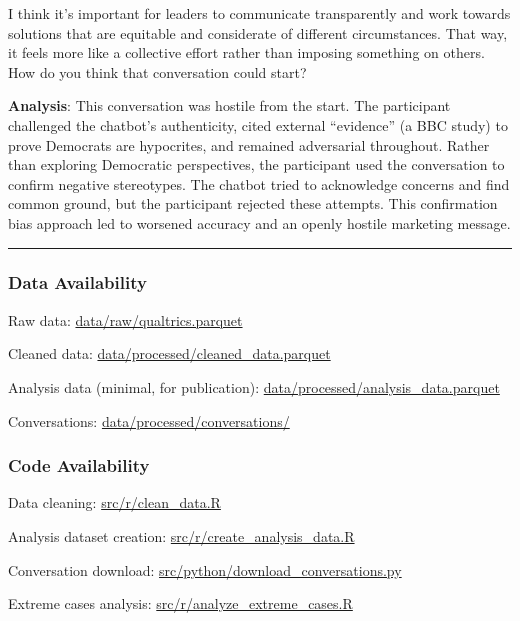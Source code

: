 \documentclass[
  11pt,
  oneside]{article}
\begin{document}
I think it's important for leaders to communicate transparently and work
towards solutions that are equitable and considerate of different
circumstances. That way, it feels more like a collective effort rather
than imposing something on others. How do you think that conversation
could start?

\textbf{Analysis}: This conversation was hostile from the start. The
participant challenged the chatbot's authenticity, cited external
``evidence'' (a BBC study) to prove Democrats are hypocrites, and
remained adversarial throughout. Rather than exploring Democratic
perspectives, the participant used the conversation to confirm negative
stereotypes. The chatbot tried to acknowledge concerns and find common
ground, but the participant rejected these attempts. This confirmation
bias approach led to worsened accuracy and an openly hostile marketing
message.

\begin{center}\rule{0.5\linewidth}{0.5pt}\end{center}

\subsubsection{Data Availability}\label{data-availability}

Raw data:
\href{../../data/raw/qualtrics.parquet}{data/raw/qualtrics.parquet}

Cleaned data:
\href{../../data/processed/cleaned_data.parquet}{data/processed/cleaned\_data.parquet}

Analysis data (minimal, for publication):
\href{../../data/processed/analysis_data.parquet}{data/processed/analysis\_data.parquet}

Conversations:
\href{../../data/processed/conversations/}{data/processed/conversations/}

\subsubsection{Code Availability}\label{code-availability}

Data cleaning: \href{../../src/r/clean_data.R}{src/r/clean\_data.R}

Analysis dataset creation:
\href{../../src/r/create_analysis_data.R}{src/r/create\_analysis\_data.R}

Conversation download:
\href{../../src/python/download_conversations.py}{src/python/download\_conversations.py}

Extreme cases analysis:
\href{../../src/r/analyze_extreme_cases.R}{src/r/analyze\_extreme\_cases.R}
\end{document}
